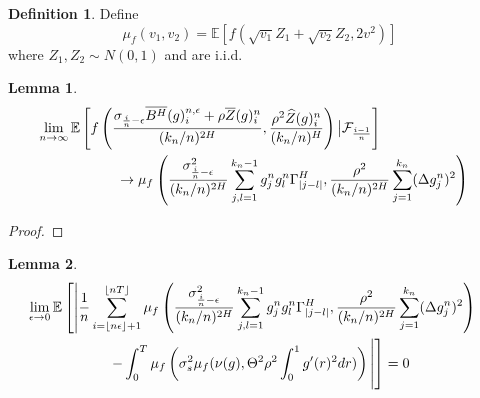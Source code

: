 \documentclass[12pt,letterpaper]{article}
\newtheorem{lemma}{Lemma}
\theoremstyle{definition}
\newtheorem*{definition}{Definition}
\newcommand{\E}{\mathbb{E}}
\begin{document}
\begin{definition}
  Define
  \begin{equation}
    \mu_f(v_1, v_2) = \E\left[ f(\sqrt{v_1}Z_1 + \sqrt{v_2}Z_2, 2v^2) \right]
  \end{equation}
  where \(Z_1, Z_2 \sim N(0,1)\) and are i.i.d.
\end{definition}

\begin{lemma}
  \begin{align}
    \phantom{}
    &\begin{aligned}
      \mathllap{} &\lim_{n \rightarrow \infty} \E\left[ f\left( \frac{\sigma_{\frac{i}{n}-\epsilon}\overline{B^H}(g)^{n,\epsilon}_i + \rho\overline{Z}(g)^n_i}{(k_n/n)^{2H}}, \frac{\rho^2\widehat{Z}(g)^n_i}{(k_n/n)^H}\right) \big| \mathcal{F}_{\frac{i-1}{n}} \right] \\
                  &\hspace*{2cm} \rightarrow \mu_f\left( \frac{\sigma^2_{\frac{i}{n}-\epsilon}}{(k_n/n)^{2H}}\sum_{j,l = 1}^{k_n-1} g^n_jg^n_l\Gamma^H_{|j-l|}, \frac{\rho^2}{(k_n/n)^{2H}}\sum_{j=1}^{k_n}(\Delta g^n_j)^2 \right)
    \end{aligned}
  \end{align}
\end{lemma}

\begin{proof}
\end{proof}

\begin{lemma}
  \begin{align}
    \phantom{}
    &\begin{aligned}
      \mathllap{} &\lim_{\epsilon \rightarrow 0}\E\left[ \left| \frac{1}{n}\sum_{i = \left\lfloor n\epsilon \right\rfloor + 1}^{\left\lfloor nT \right\rfloor}\mu_f\left( \frac{\sigma^2_{\frac{i}{n}-\epsilon}}{(k_n/n)^{2H}}\sum_{j,l = 1}^{k_n-1} g^n_jg^n_l\Gamma^H_{|j-l|}, \frac{\rho^2}{(k_n/n)^{2H}}\sum_{j=1}^{k_n}(\Delta g^n_j)^2 \right) \right.\right. \\
                  &\hspace*{2cm} \left.\left. - \int_0^T\mu_f\left(\sigma_{s}^2\mu_f(\nu(g), \Theta^2\rho^2\int_0^1g'(r)^2dr)\right) \vphantom{\E\left[ \left| \frac{1}{n}\sum_{i = \left\lfloor n\epsilon \right\rfloor + 1}^{\left\lfloor nT \right\rfloor}\mu_f\left( \frac{\sigma^2_{\frac{i}{n}-\epsilon}}{(k_n/n)^{2H}}\sum_{j,l = 1}^{k_n-1} g^n_jg^n_l\Gamma^H_{|j-l|}, \frac{\rho^2}{(k_n/n)^{2H}}\sum_{j=1}^{k_n}(\Delta g^n_j)^2 \right) \right.\right.} \right|\right] = 0
      \end{aligned}
  \end{align}
\end{lemma}
\end{document}

